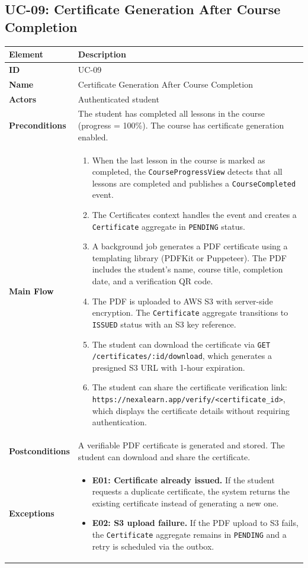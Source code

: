 \subsection{UC-09: Certificate Generation After Course Completion}

\begin{longtable}{p{3cm}p{10cm}}
  \toprule
  \textbf{Element} & \textbf{Description} \\
  \midrule
  \endhead
  \midrule
  \endfoot
  \textbf{ID} & UC-09 \\
  \textbf{Name} & Certificate Generation After Course Completion \\
  \textbf{Actors} & Authenticated student \\
  \textbf{Preconditions} & The student has completed all lessons in the course (progress = 100\%). The course has certificate generation enabled. \\
  \textbf{Main Flow} &
  \begin{enumerate}
    \item When the last lesson in the course is marked as completed, the \texttt{CourseProgressView} detects that all lessons are completed and publishes a \texttt{CourseCompleted} event.
    \item The Certificates context handles the event and creates a \texttt{Certificate} aggregate in \texttt{PENDING} status.
    \item A background job generates a PDF certificate using a templating library (PDFKit or Puppeteer). The PDF includes the student's name, course title, completion date, and a verification QR code.
    \item The PDF is uploaded to AWS S3 with server-side encryption. The \texttt{Certificate} aggregate transitions to \texttt{ISSUED} status with an S3 key reference.
    \item The student can download the certificate via \texttt{GET /certificates/:id/download}, which generates a presigned S3 URL with 1-hour expiration.
    \item The student can share the certificate verification link: \texttt{https://nexalearn.app/verify/<certificate\_id>}, which displays the certificate details without requiring authentication.
  \end{enumerate} \\
  \textbf{Postconditions} & A verifiable PDF certificate is generated and stored. The student can download and share the certificate. \\
  \textbf{Exceptions} &
  \begin{itemize}
    \item \textbf{E01: Certificate already issued.} If the student requests a duplicate certificate, the system returns the existing certificate instead of generating a new one.
    \item \textbf{E02: S3 upload failure.} If the PDF upload to S3 fails, the \texttt{Certificate} aggregate remains in \texttt{PENDING} and a retry is scheduled via the outbox.
  \end{itemize} \\
  \bottomrule
\end{longtable}

